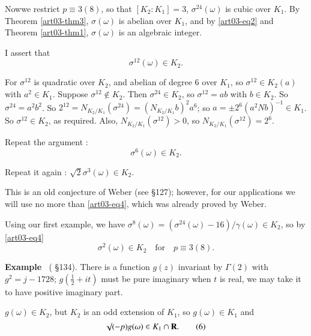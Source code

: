 Now\pageoriginale we restrict $p\equiv 3(8)$, so that $[K_{2}:K_{1}]=3$, $\sigma^{24}(\omega)$ is cubic over $K_{1}$. By Theorem \ref{art03-thm3}, $\sigma(\omega)$ is abelian over $K_{1}$, and by \eqref{art03-eq2} and Theorem \ref{art03-thm1}, $\sigma(\omega)$ is an algebraic integer.

I assert that
\begin{equation*}
\sigma^{12}(\omega)\in K_{2}.\tag{3}\label{art03-eq3}
\end{equation*}

For $\sigma^{12}$ is quadratic over $K_{2}$, and abelian of degree 6 over $K_{1}$, so $\sigma^{12}\in K_{2}(a)$ with $a^{2}\in K_{1}$. Suppose $\sigma^{12}\not\in K_{2}$. Then $\sigma^{24}\in K_{2}$, so $\sigma^{12}=ab$ with $b\in K_{2}$. So $\sigma^{24}=a^{2}b^{2}$. So $2^{12}=N_{K_{2}/K_{1}}(\sigma^{24})=(N_{K_{2}/K_{1}}b)^{2}a^{6}$; so $a=\pm 2^{6}(a^{2}Nb)^{-1}\in K_{1}$. So $\sigma^{12}\in K_{2}$, as required. Also, $N_{K_{2}/K_{1}}(\sigma^{12})>0$, so $N_{K_{2}/K_{1}}(\sigma^{12})=2^{6}$.

Repeat the argument :
\begin{equation*}
\sigma^{6}(\omega)\in K_{2}.\tag{4}\label{art03-eq4}
\end{equation*}

Repeat it again : $\surd 2 \sigma^{3}(\omega)\in K_{2}$.

This is an old conjecture of Weber (see \cite{art03-key9} \S127); however, for our applications we will use no more than \eqref{art03-eq4}, which was already proved by Weber.

Using our first example, we have $\sigma^{8}(\omega)=(\sigma^{24}(\omega)-16)/\gamma(\omega)\in K_{2}$, so by \eqref{art03-eq4}
\begin{equation*}
\sigma^{2}(\omega)\in K_{2}\text{~~ for~~ } p\equiv 3(8).\tag{5}\label{art03-eq5}
\end{equation*}

\medskip
\noindent
{\bf Example \label{art03-exam3}}~(\cite{art03-key9} \S134).
There is a function $g(z)$ invariant by $\Gamma(2)$ with $g^{2}=j-1728$; $g(\frac{1}{2}+it)$ must be pure imaginary when $t$ is real, we may take it to have positive imaginary part.

$g(\omega)\in K_{2}$, but $K_{2}$ is an odd extension of $K_{1}$, so $g(\omega)\in K_{1}$ and
\begin{equation*}
\surd (-p)g(\omega)\in K_{1}\cap \mathbf{R}.\tag{6}\label{art03-eq6}
\end{equation*}

